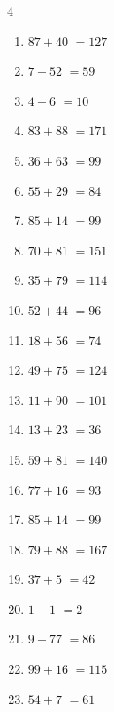 \begin{multicols}{4}
\begin{enumerate}
  \item $87+40$
        $=127$

  \item $7+52$
        $=59$

  \item $4+6$
        $=10$

  \item $83+88$
        $=171$

  \item $36+63$
        $=99$

  \item $55+29$
        $=84$

  \item $85+14$
        $=99$

  \item $70+81$
        $=151$

  \item $35+79$
        $=114$

\columnbreak %

  \item $52+44$
        $=96$

  \item $18+56$
        $=74$

  \item $49+75$
        $=124$

  \item $11+90$
        $=101$

  \item $13+23$
        $=36$

  \item $59+81$
        $=140$

  \item $77+16$
        $=93$

  \item $85+14$
        $=99$

  \item $79+88$
        $=167$

  \item $37+5$
        $=42$

  \item $1+1$
        $=2$

  \item $9+77$
        $=86$

  \item $99+16$
        $=115$

  \item $54+7$
        $=61$


\end{enumerate}
\end{multicols}
